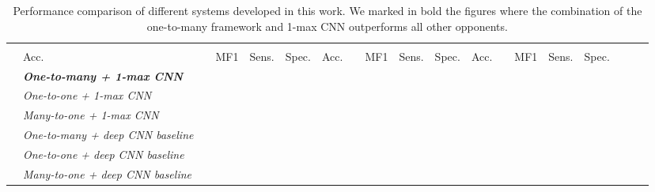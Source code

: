 \documentclass[10pt,twocolumn,twoside]{IEEEtran}
\begin{document}
\setlength\tabcolsep{2.5pt} \begin{table*}[!t]
	\caption{Performance comparison of different systems developed in this work. We marked in bold the figures where the combination of the one-to-many framework and 1-max CNN outperforms all other opponents.}
	\vspace{-0.2cm}
	\footnotesize
	\begin{center}
		\begin{tabu}{|>{\arraybackslash}m{0.1in}|>{\arraybackslash}m{1.6in}|>{\centering\arraybackslash}m{0.25in}|>{\centering\arraybackslash}m{0.25in}|>{\centering\arraybackslash}m{0.25in}|>{\centering\arraybackslash}m{0.25in}|>{\centering\arraybackslash}m{0.25in}|>{\centering\arraybackslash}m{0.25in}|>{\centering\arraybackslash}m{0.25in}|>{\centering\arraybackslash}m{0.25in}|>{\centering\arraybackslash}m{0.25in}|>{\centering\arraybackslash}m{0.25in}|>{\centering\arraybackslash}m{0.25in}|>{\centering\arraybackslash}m{0.25in}|>{\centering\arraybackslash}m{0.25in}|>{\centering\arraybackslash}m{0.25in}|>{\centering\arraybackslash}m{0.3in}|>{\centering\arraybackslash}m{0in} @{}m{0pt}@{}}
			 &  &  &  & \parbox{0pt}{\rule{0pt}{2ex+\baselineskip}} \\ [0ex]  	
			 & Acc. &  & MF1 & Sens. & Spec. &  Acc. &  & MF1 & Sens. & Spec. & Acc. &  &   MF1 & Sens. & Spec. &  \parbox{0pt}{\rule{0pt}{2ex+\baselineskip}} \\ [0ex]  	
			 & \emph{\bf One-to-many + 1-max CNN} &  &  &  &  &  &  &  &  &  &  &  & \parbox{0pt}{\rule{0pt}{0.5ex+\baselineskip}} \\ [0ex]  	& \emph{One-to-one + 1-max CNN} &   &  &  &  &  &  &  &  &  &  &  & \parbox{0pt}{\rule{0pt}{0.5ex+\baselineskip}} \\ [0ex]  	& \emph{Many-to-one + 1-max CNN} &  &  &  &  &  &  &  &  &  &  &  & \parbox{0pt}{\rule{0pt}{0.5ex+\baselineskip}} \\ [0ex]  	& \emph{One-to-many + deep CNN baseline} &  &  &  &  &  &  &  &  &  &  &  & \parbox{0pt}{\rule{0pt}{0.5ex+\baselineskip}} \\ [0ex]  	& \emph{One-to-one + deep CNN baseline} &  &  &  &  &  &  &  &  &  &  &  & \parbox{0pt}{\rule{0pt}{0.5ex+\baselineskip}} \\ [0ex]  	& \emph{Many-to-one + deep CNN baseline} &  &  &  &  &  &  &  &  &   &  &  & \parbox{0pt}{\rule{0pt}{0.5ex+\baselineskip}} \\ [0ex]  	

\end{tabu}
\end{center}
\end{table*}
\end{document}
